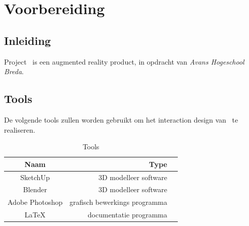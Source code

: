 \chapter{Voorbereiding} \label{cha:voorbereiding}

\section{Inleiding} \label{sec:inleiding}
Project \projectname\ is een augmented reality product, in opdracht van \textit{Avans Hogeschool Breda}.

\section{Tools} \label{sec:tools}
De volgende tools zullen worden gebruikt om het interaction design van \projectname\ te realiseren.

\begin{table}[h]
  \centering
  \caption{Tools}
  \label{tb:table}
  \begin{tabular}{crl}
    \toprule
    Naam     & Type\\
    \midrule
    SketchUp     & 3D modelleer software\\
    Blender  & 3D modelleer software\\
    Adobe Photoshop & grafisch bewerkings programma\\
    LaTeX & documentatie programma\\
    \bottomrule
  \end{tabular}
\end{table}

\newpage
